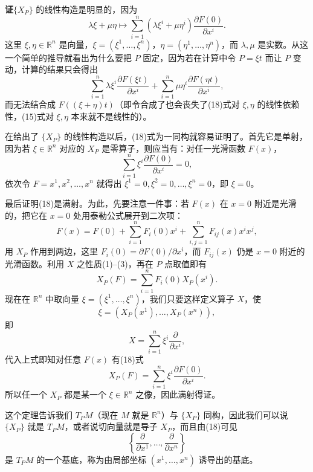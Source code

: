 \noindent\textbf{证}\quad $\{X_P\}$ 的线性构造是明显的，因为
\[
 \lambda\xi+\mu\eta\longmapsto
 \sum_{i=1}^n(\lambda\xi^i+\mu\eta^i)\frac{\partial F(0)}{\partial x^i}.
\]
这里 $\xi,\eta\in\mathbb R^n$ 是向量，$\xi=(\xi^1,\ldots,\xi^n)$，$\eta=(\eta^1,\ldots,\eta^n)$，而 $\lambda,\mu$ 是实数。从这一个简单的推导就看出为什么要把 $P$ 固定，因为若在计算中令 $P=\xi t$ 而让 $P$ 变动，计算的结果只会得出
\begin{equation}
 \sum_{i=1}^n\lambda\xi^i\frac{\partial F(\xi t)}{\partial x^i}
 +\sum_{i=1}^n\mu\eta^i\frac{\partial F(\eta t)}{\partial x^i},
 \tag{19}
\end{equation}
而无法结合成 $F((\xi+\eta)t)$（即令合成了也会丧失了(18)式对 $\xi,\eta$ 的线性依赖性，(15)式对 $\xi,\eta$ 本来就不是线性的）。

在给出了 $\{X_P\}$ 的线性构造以后，(18)式为一同构就容易证明了。首先它是单射，因为若 $\xi\in\mathbb R^n$ 对应的 $X_P$ 是零算子，则应当有：对任一光滑函数 $F(x)$，
\[
 \sum_{i=1}^n\xi^i\frac{\partial F(0)}{\partial x^i}=0,
\]
依次令 $F=x^1,x^2,\ldots,x^n$ 就得出 $\xi^1=0,\xi^2=0,\ldots,\xi^n=0$，即 $\xi=0$。

最后证明(18)是满射。为此，先要注意一件事：若 $F(x)$ 在 $x=0$ 附近是光滑的，把它在 $x=0$ 处用泰勒公式展开到二次项：
\[
 F(x)=F(0)+\sum_{i=1}^nF_i(0)x^i+\sum_{i,j=1}^nF_{ij}(x)x^ix^j,
\]
用 $X_P$ 作用到两边，这里 $F_i(0)=\partial F(0)/\partial x^i$，而 $F_{ij}(x)$ 仍是 $x=0$ 附近的光滑函数。利用 $X$ 之性质(1)--(3)，再在 $P$ 点取值即有
\[
 X_P(F)=\sum_{i=1}^nF_i(0)X_P(x^i).
\]
现在在 $\mathbb R^n$ 中取向量 $\xi=(\xi^1,\ldots,\xi^n)$，我们只要这样定义算子 $X$，使
\[
 \xi=(X_P(x^1),\ldots,X_P(x^n)),
\]
即
\[
 X=\sum_{i=1}^n\xi^i\frac{\partial}{\partial x^i},
\]
代入上式即知对任意 $F(x)$ 有(18)式
\[
 X_P(F)=\sum_{i=1}^n\xi^i\frac{\partial F(0)}{\partial x^i}.
\]
所以任一个 $X_P$ 都是某一个 $\xi\in\mathbb R^n$ 之像，因此满射得证。

这个定理告诉我们 $T_PM$（现在 $M$ 就是 $\mathbb R^n$）与 $\{X_P\}$ 同构，因此我们可以说 $\{X_P\}$ 就是 $T_PM$，或者说切向量就是导子 $X_P$，而且由(18)可见
\[
 \left\{\frac{\partial}{\partial x^1},\ldots,
 \frac{\partial}{\partial x^n}\right\}
\]
是 $T_PM$ 的一个基底，称为由局部坐标 $(x^1,\ldots,x^n)$ 诱导出的基底。

